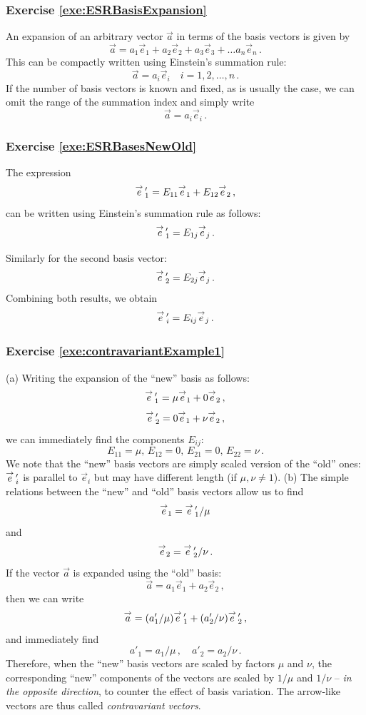 \subsubsection*{Exercise \ref{exe:ESRBasisExpansion}}
An expansion of an arbitrary vector $\vec{a}$ in terms of the basis
vectors is given by
\[
\vec{a} = a_1\vec{e}_1+a_2\vec{e}_2+a_3\vec{e}_3+\ldots a_n\vec{e}_n\,.
\]
This can be compactly written using Einstein's summation rule:
\[
\vec{a} = a_i\vec{e}_i\quad i=1,2,\ldots, n\,.
\]
If the number of basis vectors is known and fixed, as is usually the
case, we can omit the range of the summation index and simply write
\[
\vec{a} = a_i\vec{e}_i\,.
\]

\subsubsection*{Exercise \ref{exe:ESRBasesNewOld}}
The expression
\[
\overset{\rightarrow}{e}\,'_{1}=E_{11}\overset{\rightarrow}{e}_{1}+E_{12}\overset{\rightarrow}{e}_{2}\,,
\]
can be written using Einstein's summation rule as follows:
\[
\overset{\rightarrow}{e}\,'_{1}=E_{1j}\overset{\rightarrow}{e}_{j}\,.
\]

Similarly for the second basis vector:
\[
\overset{\rightarrow}{e}\,'_{2}=E_{2j}\overset{\rightarrow}{e}_{j}\,.
\]
Combining both results, we obtain
\[
\overset{\rightarrow}{e}\,'_i = E_{ij} \overset{\rightarrow}{e}_j\,.
\]

\subsubsection*{Exercise \ref{exe:contravariantExample1}}
(a) Writing the expansion of the ``new'' basis as follows:
\[
\overset{\rightarrow}{e}\,'_1 = \mu \overset{\rightarrow}{e}_{1} + 0\overset{\rightarrow}{e}_2\,,
\]
\[
\overset{\rightarrow}{e}\,'_2 = 0 \overset{\rightarrow}{e}_{1} + \nu\overset{\rightarrow}{e}_2\,,
\]
we can immediately find the components $E_{ij}$:
\[
E_{11} = \mu,\,E_{12} = 0,\,E_{21} = 0,\,E_{22} = \nu\,.
\]
We note that the ``new'' basis vectors are simply scaled version of
the ``old'' ones: $\overset{\rightarrow}{e}\,'_i$ is parallel to $\vec{e}_i$ but may have
different length (if $\mu,\nu \ne 1$).
(b) The simple relations between the ``new'' and ``old'' basis vectors
allow us to find
\[
\overset{\rightarrow}{e}_1 = \overset{\rightarrow}{e}\,'_{1} / \mu
\]
and
\[
\overset{\rightarrow}{e}_2 = \overset{\rightarrow}{e}\,'_2 / \nu\,.
\]
If the vector $\vec{a}$ is expanded using the ``old'' basis:
\[
\vec{a} = a_1\vec{e}_1 + a_2\vec{e}_2\,,
\]
then we can write
\[
\overset{\rightarrow}{a} = (a'_1/\mu)\overset{\rightarrow}{e}\,'_1 + (a'_2/\nu)\overset{\rightarrow}{e}\,'_2\,,
\]
and immediately find
\[
a'_1 = a_1/\mu\,,\quad a'_2 = a_2/\nu\,.
\]
Therefore, when the ``new'' basis vectors are scaled by factors $\mu$
and $\nu$, the corresponding ``new'' components of the vectors are
scaled by $1/\mu$ and $1/\nu$ -- \emph{in the opposite direction}, to
counter the effect of basis variation. The arrow-like vectors are thus called
\emph{contravariant vectors}.

